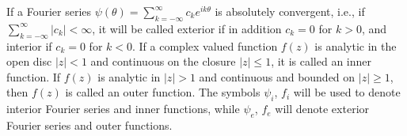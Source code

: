 If a Fourier series $\psi(\theta) = \sum_{k=-\infty}^{\infty} c_k e^{ik\theta}$ is absolutely convergent, i.e., if $\sum_{k=-\infty}^{\infty} |c_k| < \infty$, it will be called exterior if in addition $c_k = 0$ for $k > 0$, and interior if $c_k = 0$ for $k < 0$. If a complex valued function $f(z)$ is analytic in the open disc $|z| < 1$ and continuous on the closure $|z| \leq 1$, it is called an inner function. If $f(z)$ is analytic in $|z| > 1$ and continuous and bounded on $|z| \geq 1$, then $f(z)$ is called an outer function. The symbols $\psi_i$, $f_i$ will be used to denote interior Fourier series and inner functions, while $\psi_e$, $f_e$ will denote exterior Fourier series and outer functions.